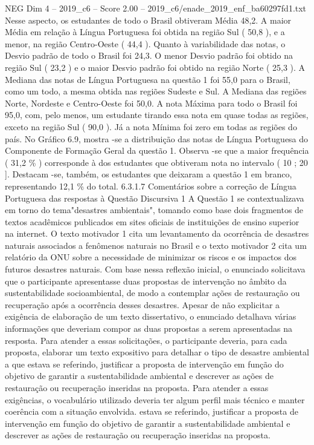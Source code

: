 \begin{textsample}{NEG Dim 4 – 2019\_c6 – Score 2.00 – 2019\_c6/enade\_2019\_enf\_ba60297fd1.txt}
Nesse aspecto, os estudantes de todo o Brasil obtiveram Média 48,2.
A maior Média em relação à Língua Portuguesa foi obtida na região Sul ( 50,8 ), e a menor, na região Centro-Oeste ( 44,4 ).
Quanto à variabilidade das notas, o Desvio padrão de todo o Brasil foi 24,3.
O menor Desvio padrão foi obtido na região Sul ( 23,2 ) e o maior Desvio padrão foi obtido na região Norte ( 25,3 ).
A Mediana das notas de Língua Portuguesa na questão 1 foi 55,0 para o Brasil, como um todo, a mesma obtida nas regiões Sudeste e Sul.
A Mediana das regiões Norte, Nordeste e Centro-Oeste foi 50,0.
A nota Máxima para todo o Brasil foi 95,0, com, pelo menos, um estudante tirando essa nota em quase todas as regiões, exceto na região Sul ( 90,0 ).
Já a nota Mínima foi zero em todas as regiões do país.
No Gráfico 6.9, mostra -se a distribuição das notas de Língua Portuguesa do Componente de Formação Geral da questão 1.
Observa -se que a maior frequência ( 31,2 \% ) corresponde à dos estudantes que obtiveram nota no intervalo ( 10 ; 20 ].
Destacam -se, também, os estudantes que deixaram a questão 1 em branco, representando 12,1 \% do total. 6.3.1.7 Comentários sobre a correção de Língua Portuguesa das respostas à Questão Discursiva 1 A Questão 1 se contextualizava em torno do tema"desastres ambientais", tomando como base dois fragmentos de textos acadêmicos publicados em sites oficiais de instituições de ensino superior na internet.
O texto motivador 1 cita um levantamento da ocorrência de desastres naturais associados a fenômenos naturais no Brasil e o texto motivador 2 cita um relatório da ONU sobre a necessidade de minimizar os riscos e os impactos dos futuros desastres naturais.
Com base nessa reflexão inicial, o enunciado solicitava que o participante apresentasse duas propostas de intervenção no âmbito da sustentabilidade socioambiental, de modo a contemplar ações de restauração ou recuperação após a ocorrência desses desastres.
Apesar de não explicitar a exigência de elaboração de um texto dissertativo, o enunciado detalhava várias informações que deveriam compor as duas propostas a serem apresentadas na resposta.
Para atender a essas solicitações, o participante deveria, para cada proposta, elaborar um texto expositivo para detalhar o tipo de desastre ambiental a que estava se referindo, justificar a proposta de intervenção em função do objetivo de garantir a sustentabilidade ambiental e descrever as ações de restauração ou recuperação inseridas na proposta.
Para atender a essas exigências, o vocabulário utilizado deveria ter algum perfil mais técnico e manter coerência com a situação envolvida. estava se referindo, justificar a proposta de intervenção em função do objetivo de garantir a sustentabilidade ambiental e descrever as ações de restauração ou recuperação inseridas na proposta.

\end{textsample}
